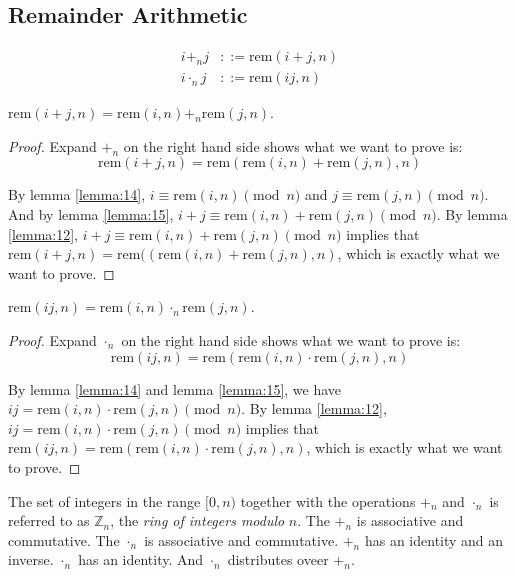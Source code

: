 \documentclass[11pt]{article}
\newcommand{\rem}{\mathrm{rem}}
\begin{document}
\subsection{Remainder Arithmetic}

\begin{definition}
\begin{align*}
i +_n j &::= \rem(i+j, n) \\
i \cdot_n j &::= \rem(ij, n)
\end{align*}
\end{definition}

\begin{lemma} \label{lemma:17}
$\rem(i+j,n) = \rem(i,n) +_n \rem(j,n)$.
\end{lemma}


\begin{proof}
Expand $+_n$ on the right hand side shows what we want to prove is:
\[
  \rem(i+j,n) = \rem(\rem(i,n)+\rem(j,n),n)
\]

By lemma \ref{lemma:14}, $i \equiv \rem(i,n) \pmod{n}$ and $j \equiv \rem(j,n) \pmod{n}$. And
by lemma \ref{lemma:15}, $i+j \equiv \rem(i,n)+\rem(j,n) \pmod{n}$. By lemma \ref{lemma:12},
$i+j \equiv \rem(i,n) + \rem(j,n) \pmod{n}$ implies that
$\rem(i+j,n) = \rem((\rem(i,n) + \rem(j,n), n)$, which is exactly what we want to prove.
\end{proof}

\begin{lemma} \label{lemma:18}
$\rem(ij,n) = \rem(i,n) \cdot_n \rem(j,n)$.
\end{lemma}

\begin{proof}
Expand $\cdot_n$ on the right hand side shows what we want to prove is:
\[
  \rem(ij,n) = \rem(\rem(i,n) \cdot \rem(j,n),n)
\]

By lemma \ref{lemma:14} and lemma \ref{lemma:15}, we have
$ij = \rem(i,n) \cdot \rem(j,n) \pmod{n}$. By lemma \ref{lemma:12},
$ij = \rem(i,n) \cdot \rem(j,n) \pmod{n}$ implies that
$\rem(ij,n) = \rem(\rem(i,n) \cdot \rem(j,n), n)$, which is exactly what we want to prove.
\end{proof}

The set of integers in the range $[0, n)$ together with the operations $+_n$ and $\cdot_n$
is referred to as $\mathbb{Z}_n$, the \emph{ring of integers modulo} $n$. The $+_n$ is
associative and commutative. The $\cdot_n$ is associative and commutative. $+_n$ has an
identity and an inverse. $\cdot_n$ has an identity. And $\cdot_n$ distributes oveer $+_n$.
\end{document}

